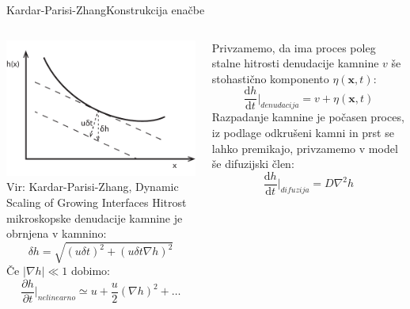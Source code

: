 \documentclass{beamer}
\begin{document}
\begin{frame}{Kardar-Parisi-Zhang}{Konstrukcija enačbe}
\begin{columns}
  \begin{column}{0.45\textwidth}
    \footnotesize
    \includegraphics[width=1\textwidth]{slike/denudacija}
    \tiny{\\ Vir: Kardar-Parisi-Zhang, Dynamic Scaling of Growing Interfaces}
    \newline
    \newline
    Hitrost mikroskopske denudacije kamnine je obrnjena v kamnino:
    \begin{equation} \delta h = \sqrt{ (u \delta t)^2 + (u \delta t \nabla h)^2} \end{equation}   
    Če $|\nabla h| \ll 1$ dobimo: 
    \begin{equation} \frac{\partial h}{\partial t} \bigg|_{nelinearno} \simeq u + \frac{u}{2} (\nabla h)^2 + \dots \end{equation}
    
  \end{column}
  \begin{column}{0.55\textwidth}
    \tiny
    Privzamemo, da ima proces poleg stalne hitrosti denudacije kamnine $v$ še stohastično komponento $\eta(\mathbf{x},t)$:
    \begin{equation} \frac{\mathrm{d} h}{\mathrm{d} t} \bigg|_{denudacija} = v + \eta(\mathbf{x},t) \end{equation}
    Razpadanje kamnine je počasen proces, iz podlage odkrušeni kamni in prst se lahko premikajo, privzamemo v model še difuzijski člen:
\begin{equation} \frac{\mathrm{d} h}{\mathrm{d} t} \bigg|_{difuzija} = D \nabla^2 h \end{equation}
    \newline


\end{column}
\end{columns}
\end{frame}
\end{document}
